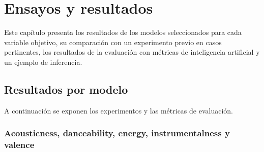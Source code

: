 
\chapter{Ensayos y resultados} %

\label{Chapter4} %

Este capítulo presenta los resultados de los modelos seleccionados para cada variable objetivo, su comparación con un experimento previo en casos pertinentes, los resultados de la evaluación con métricas de inteligencia artificial y un ejemplo de inferencia.

\section{Resultados por modelo}
\label{sec:resultados_modelos}

A continuación se exponen los experimentos y las métricas de evaluación.

\subsection{Acousticness, danceability, energy, instrumentalness y valence}

